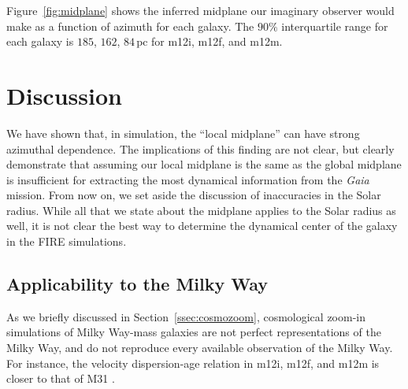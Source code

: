 \documentclass[twocolumn]{aastex62}
\newcommand{\Gus}[1]{\textcolor{red}{#1}}
\newcommand{\pc}{\text{pc}}
\newcommand{\kpc}{\text{kpc}}
\newcommand{\uth}{\textsuperscript{th}}
\begin{document}
Figure~\ref{fig:midplane} shows the inferred midplane our imaginary observer
would make as a function of azimuth for each galaxy. The $90\%$ interquartile
range for each galaxy is $185$, $162$, $84\,\pc$ for m12i, m12f, and m12m. 

\begin{figure*}
\caption{The local midplane determined at the fiducial Solar radius
($8.2\,\kpc$) for the three FIRE galaxies m12i, m21f, and m12m ({\em left},
{\em center}, and {\em right} panels). The local midplane is determined at a
position $\phi$ by taking the median height of all stars within $R=0.5\,\kpc$
and $z=1\,\kpc$ (in cylindrical coordinates). The procedure is performed again
using the new height $10$ times to converge on the local midplane height. In
order to allow for the possibility that the fiducial Galactocentric coordinate
system is incorrect, we subtract the best fit $A\sin{(\phi+B)}+C$ curve from
each panel --- this figure is reproduced with the original midplane
determination (i.e. before subtracting the best fit sine curve) in
Appendix~\Gus{x}. We then bootstrap resample $1000$ times on all stars within
a $2\,\kpc$ height of the fiducial midplane to determine error bars (95\uth
and 5\uth percentiles), which we report as dashed lines.}
\label{fig:midplane}
\end{figure*}

\section{Discussion} \label{sec:discussion}
We have shown that, in simulation, the ``local midplane'' can have strong
azimuthal dependence. The implications of this finding are not clear, but
clearly demonstrate that assuming our local midplane is the same as the global
midplane is insufficient for extracting the most dynamical information from
the {\em Gaia} mission. From now on, we set aside the discussion of
inaccuracies in the Solar radius. While all that we state about the midplane
applies to the Solar radius as well, it is not clear the best way to determine
the dynamical center of the galaxy in the FIRE simulations.

\subsection{Applicability to the Milky Way} \label{ssec:is_it_real}
As we briefly discussed in Section~\ref{ssec:cosmozoom}, cosmological zoom-in
simulations of Milky Way-mass galaxies are not perfect representations of the
Milky Way, and do not reproduce every available observation of the Milky Way.
For instance, the velocity dispersion-age relation in m12i, m12f, and m12m is
closer to that of M31 \citep{2018arXiv180610564S}.
\end{document}

